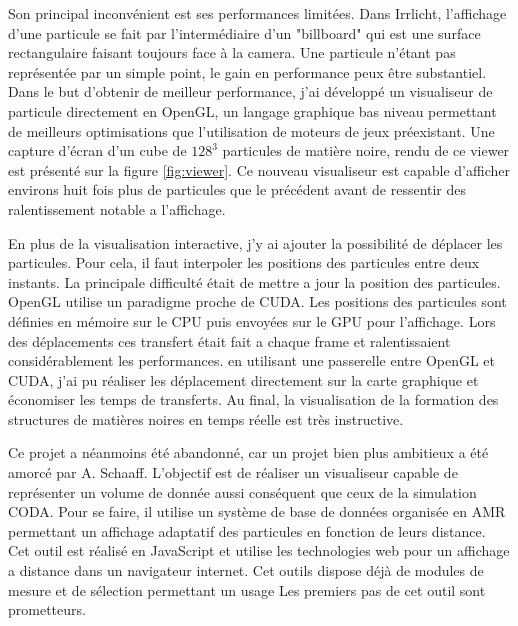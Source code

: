 Son principal inconvénient est ses performances limitées.
Dans Irrlicht, l'affichage d'une particule se fait par l'intermédiaire d'un "billboard" qui est une surface rectangulaire faisant toujours face à la camera.
Une particule n'étant pas représentée par un simple point, le gain en performance peux être substantiel.
Dans le but d'obtenir de meilleur performance, j'ai développé un visualiseur de particule directement en OpenGL, un langage graphique bas niveau permettant de meilleurs optimisations que l'utilisation de moteurs de jeux préexistant.
Une capture d'écran d'un cube de $128^3$ particules de matière noire, rendu de ce viewer est présenté sur la figure \ref{fig:viewer}.
Ce nouveau visualiseur est capable d'afficher environs huit fois plus de particules que le précédent avant de ressentir des ralentissement notable a l'affichage. 


En plus de la visualisation interactive, j'y ai ajouter la possibilité de déplacer les particules.
Pour cela, il faut interpoler les positions des particules entre deux instants.
La principale difficulté était de mettre a jour la position des particules.
OpenGL utilise un paradigme proche de CUDA.
Les positions des particules sont définies en mémoire sur le CPU puis envoyées sur le GPU pour l'affichage.
Lors des déplacements ces transfert était fait a chaque frame et ralentissaient considérablement les performances.
en utilisant une passerelle entre OpenGL et CUDA, j'ai pu réaliser les déplacement directement sur la carte graphique et économiser les temps de transferts.
Au final, la visualisation de la formation des structures de matières noires en temps réelle est très instructive.

Ce projet a néanmoins été abandonné, car un projet bien plus ambitieux a été amorcé par A. Schaaff.
L'objectif est de réaliser un visualiseur capable de représenter un volume de donnée aussi conséquent que ceux de la simulation CODA.
Pour se faire, il utilise un système de base de données organisée en AMR permettant un affichage adaptatif des particules en fonction de leurs distance.
Cet outil est réalisé en JavaScript et utilise les technologies web pour un affichage a distance dans un navigateur internet.
Cet outils dispose déjà de modules de mesure et de sélection permettant un usage 
Les premiers pas de cet outil sont prometteurs.





